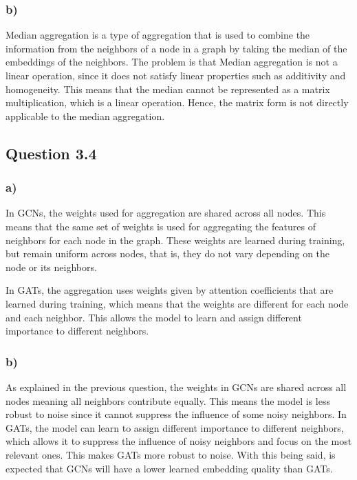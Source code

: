 \documentclass{article}
\begin{document}
\subsubsection*{b)}

Median aggregation is a type of aggregation that is used to combine the information from the neighbors of a node in a graph
by taking the median of the embeddings of the neighbors. The problem is that Median aggregation is not a linear
operation, since it does not satisfy linear properties such as additivity and homogeneity. This means that the median
cannot be represented as a matrix multiplication, which is a linear operation.
Hence, the matrix form is not directly applicable to the median aggregation.

\subsection*{Question 3.4}

\subsubsection*{a)}

In GCNs, the weights used for aggregation are shared across all nodes. This means that the same set of weights is
used for aggregating the features of neighbors for each node in the graph. These weights are learned during
training, but remain uniform across nodes, that is, they do not vary depending on the node or its neighbors.

In GATs, the aggregation uses weights given by attention coefficients that are learned during training, which means that
the weights are different for each node and each neighbor. This allows the model to learn and assign different importance
to different neighbors. 

\subsubsection*{b)}

As explained in the previous question, the weights in GCNs are shared across all nodes meaning all neighbors contribute equally. This means the model is
less robust to noise since it cannot suppress the influence of some noisy neighbors. In GATs, the model can learn to assign
different importance to different neighbors, which allows it to suppress the influence of noisy neighbors and focus on the
most relevant ones. This makes GATs more robust to noise. With this being said, is expected that GCNs will have a lower
learned embedding quality than GATs.
\end{document}

